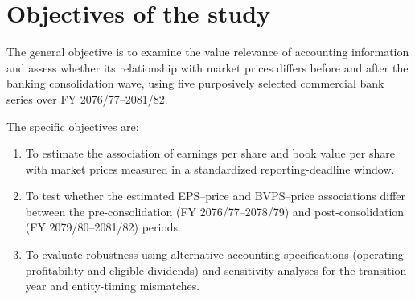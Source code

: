 \section{Objectives of the study}

The general objective is to examine the value relevance of accounting
information and assess whether its relationship with market prices differs
before and after the banking consolidation wave, using five purposively selected
commercial bank series over FY 2076/77--2081/82.

The specific objectives are:
{\renewcommand{\theenumi}{\Roman{enumi}}
\begin{enumerate}[label=\Roman*.,align=right,leftmargin=44.2pt,labelwidth=30pt,labelsep=14.2pt]
  \item To estimate the association of earnings per share and book value per share with market prices measured in a standardized reporting-deadline window.
  \item To test whether the estimated EPS--price and BVPS--price associations differ between the pre-consolidation (FY 2076/77--2078/79) and post-consolidation (FY 2079/80--2081/82) periods.
  \item To evaluate robustness using alternative accounting specifications (operating profitability and eligible dividends) and sensitivity analyses for the transition year and entity-timing mismatches.
\end{enumerate}
}
